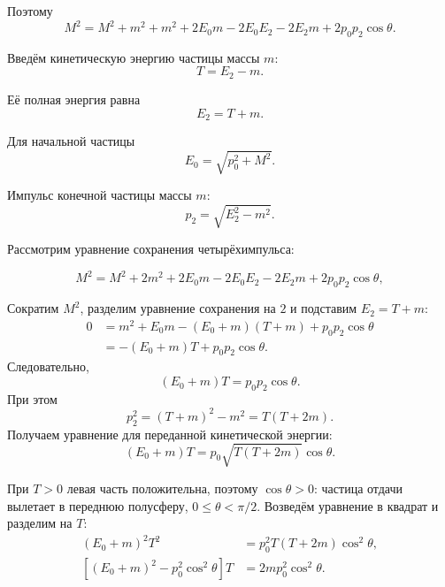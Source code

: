 \documentclass[../final.tex]{subfiles}
\begin{document}
Поэтому
%
\begin{equation*}
    M^2
    =
    M^2
    +
    m^2
    +
    m^2
    +
    2E_0m
    -
    2E_0E_2
    -
    2E_2m
    +
    2p_0p_2\cos\theta.
\end{equation*}

Введём кинетическую энергию частицы массы $m$:
%
\begin{equation*}
    T
    =
    E_2-m.
\end{equation*}

Её полная энергия равна
%
\begin{equation*}
    E_2
    =
    T+m.
\end{equation*}

Для начальной частицы
%
\begin{equation*}
    E_0
    =
    \sqrt{
        p_0^2+M^2
    }.
\end{equation*}

Импульс конечной частицы массы $m$:
%
\begin{equation*}
    p_2
    =
    \sqrt{
        E_2^2-m^2
    }.
\end{equation*}

Рассмотрим уравнение сохранения четырёхимпульса:

\begin{equation*}
    M^2
    =
    M^2
    +
    2m^2
    +
    2E_0m
    -
    2E_0E_2
    -
    2E_2m
    +
    2p_0p_2\cos\theta,
\end{equation*}

Сократим $M^2$, разделим уравнение сохранения на $2$
и подставим $E_2=T+m$:
%
\begin{align*}
    0
    &=m^2+E_0m-(E_0+m)(T+m)+p_0p_2\cos\theta\\
    &=-(E_0+m)T+p_0p_2\cos\theta.
\end{align*}
%
Следовательно,
%
\begin{equation*}
    (E_0+m)T=p_0p_2\cos\theta.
\end{equation*}
%
При этом
%
\begin{equation*}
    p_2^2=(T+m)^2-m^2=T(T+2m).
\end{equation*}
%
Получаем уравнение для переданной кинетической энергии:
%
\begin{equation*}
    (E_0+m)T=p_0\sqrt{T(T+2m)}\cos\theta.
\end{equation*}

При $T>0$ левая часть положительна, поэтому $\cos\theta>0$:
частица отдачи вылетает в переднюю полусферу,
$0\leq\theta<\pi/2$.
Возведём уравнение в квадрат и разделим на $T$:
%
\begin{align*}
    (E_0+m)^2T^2
    &=p_0^2T(T+2m)\cos^2\theta,\\
    \left[(E_0+m)^2-p_0^2\cos^2\theta\right]T
    &=2mp_0^2\cos^2\theta.
\end{align*}
\end{document}
